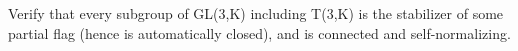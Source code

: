 Verify that every subgroup of GL(3,K) including T(3,K) is the stabilizer of some partial flag (hence is automatically closed), and is connected and self-normalizing.
